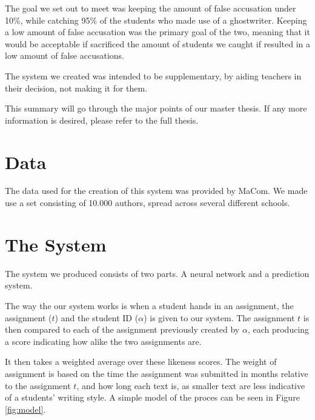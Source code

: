 \documentclass[11pt]{article}
\begin{document}
    The goal we set out to meet was keeping the amount of false accusation under
    10\%, while catching 95\% of the students who made use of a ghostwriter.
    Keeping a low amount of false accusation was the primary goal of the two,
    meaning that it would be acceptable if sacrificed the amount of students we
    caught if resulted in a low amount of false accusations.

    The system we created was intended to be supplementary, by aiding teachers
    in their decision, not making it for them.

    This summary will go through the major points of our master thesis.
    If any more information is desired, please refer to the full thesis.


    \section{Data}

    The data used for the creation of this system was provided by MaCom. We made
    use a set consisting of 10.000 authors, spread across several different
    schools.

     
    \section{The System}

    The system we produced consists of two parts. A neural network
    and a prediction system.

    The way the our system works is when a student hands in an assignment,
    the assignment ($t$) and the student ID ($\alpha$) is given to our system.
    The assignment $t$ is then compared to each of the assignment previously
    created by $\alpha$, each producing a score indicating how alike the two
    assignments are.

    It then takes a weighted average over these likeness scores. The weight
    of assignment is based on the time the assignment was submitted in months
    relative to the assignment $t$, and how long each text is, as smaller text
    are less indicative of a students' writing style. A simple model of the proces
    can be seen in Figure \ref{fig:model}.
\end{document}
